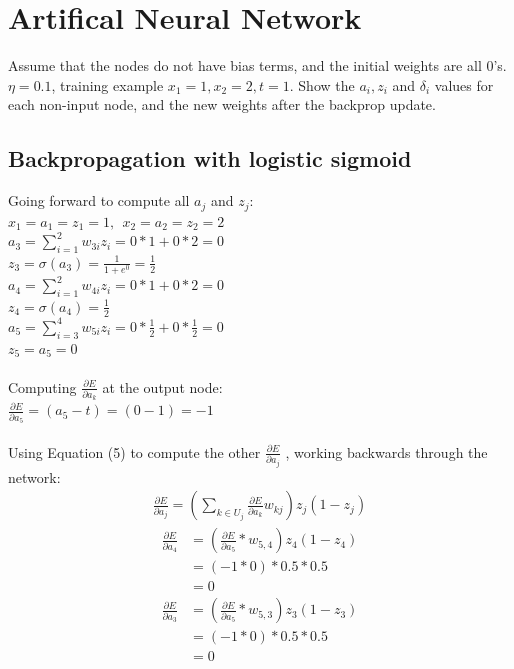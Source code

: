 \documentclass{article}
\begin{document}
\section{Artifical Neural Network}
Assume that the nodes do not have bias terms, and the initial weights are all $0$'s. \\
$\eta = 0.1$, training example $x_1 = 1, x_2 =2, t=1$. Show the $a_i,z_i$ and $\delta_i$ values for each non-input node, and the new weights after the backprop update.
\subsection*{Backpropagation with logistic sigmoid}
Going forward to compute all $a_j$ and $z_j$: \\
$x_1 = a_1 = z_1 = 1,~~x_2 = a_2 = z_2 =  2$ \\
$a_3 = \sum_{i=1}^{2} w_{3i} z_{i} =  0*1 + 0*2 = 0   $ \\
$z_3 = \sigma(a_3) = \frac{1}{1 + e^0} = \frac{1}{2}$ \\
$a_4 = \sum_{i=1}^{2} w_{4i} z_{i} =  0*1 + 0*2 = 0   $ \\
$z_4 = \sigma(a_4) = \frac{1}{2}$ \\
$a_5 = \sum_{i=3}^{4} w_{5i} z_{i} =  0*\frac{1}{2} + 0*\frac{1}{2} = 0   $ \\
$z_5 = a_5 = 0$ \\
\\
Computing $\frac{\partial E}{\partial a_k}$ at the output node: \\
$\frac{\partial E}{\partial a_{5}} = \left( a_5 - t \right) = (0 - 1) = -1$ \\
\\
Using Equation (5) to compute the other $\frac{\partial E}{\partial a_j}$ , working backwards through the network: \\
\begin{align*}
\frac{\partial E}{\partial a_j} = \left( \sum_{k \in U_j} \frac{\partial E}{\partial a_k} w_{kj}  \right) z_j (1-z_j)
\end{align*}
\begin{align*}
\frac{\partial E}{\partial a_4} &= \left( \frac{\partial E}{\partial a_5}*w_{5,4} \right)z_4(1-z_4) \\
&= (-1*0)*0.5*0.5 \\
&= 0
\end{align*}
\begin{align*}
\frac{\partial E}{\partial a_3} &= \left( \frac{\partial E}{\partial a_5}*w_{5,3} \right)z_3(1-z_3) \\
&= (-1*0)*0.5*0.5 \\
&= 0
\end{align*}
\end{document}
